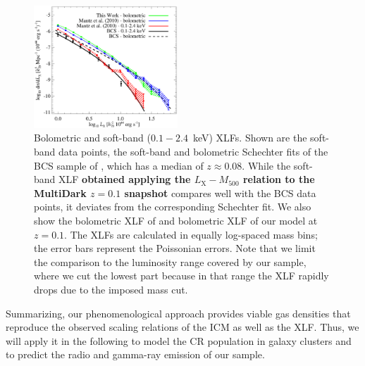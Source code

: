 \documentclass[traditabstract]{aa}
\def\C#1{{\bf #1}}
\newcommand{\rmn}{\mathrm}
\begin{document}
\begin{figure}[t]
\centering
\includegraphics[width=0.48\textwidth]{figures/xlf.eps}
\caption{Bolometric and soft-band ($0.1-2.4$~keV) XLFs. Shown are the soft-band
  data points, the soft-band and bolometric Schechter fits of the BCS sample of
  \cite{1997ApJ...479L.101E}, which has a median of $z \approx 0.08$.  While the
  soft-band XLF \C{obtained applying the \cite{2010MNRAS.406.1773M} $L_{\rmn{X}}-M_{500}$
  relation to the MultiDark $z = 0.1$ snapshot} compares well with the BCS data
  points, it deviates from the corresponding Schechter fit. We also show the
  bolometric XLF of \cite{2010MNRAS.406.1773M} and bolometric XLF of our 
  model at $z=0.1$. The XLFs are calculated in equally log-spaced mass bins; the error
  bars represent the Poissonian errors. Note that we limit the comparison to the
  luminosity range covered by our sample, where we cut the lowest part because
  in that range the XLF rapidly drops due to the imposed mass cut.  }
\label{fig:XLF}
\end{figure}

Summarizing, our phenomenological approach provides viable gas densities that
reproduce the observed scaling relations of the ICM as well as the XLF. Thus, we
will apply it in the following to model the CR population in galaxy clusters and
to predict the radio and gamma-ray emission of our sample.


\end{document}
